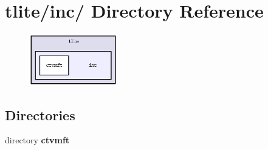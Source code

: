 \section{tlite/inc/ Directory Reference}
\label{dir_66b2dac885c553117c87c816d9985fc2}


\begin{figure}[H]
\begin{center}
\leavevmode
\includegraphics[width=109pt]{dir_66b2dac885c553117c87c816d9985fc2_dep}
\end{center}
\end{figure}
\subsection*{Directories}
\begin{CompactItemize}
\item 
directory \bf{ctvmft}
\end{CompactItemize}
